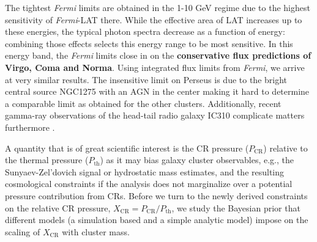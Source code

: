 \documentclass[10pt,aps,pra,reprint,amsmath,amsfonts,amssymb,showpacs,nofootinbib,floatfix]{revtex4-1}
\def\del#1{{}}
\def\C#1{{\bf #1}}
\newcommand{\Fermi}{{\em Fermi}\xspace}
\newcommand{\rmn}{\mathrm}
\newcommand{\CR}{\rmn{CR}}
\begin{document}
The tightest \Fermi limits are obtained in the 1-10 GeV
regime due to the highest sensitivity of \Fermi-LAT there. While the
effective area of LAT increases up to these energies, the typical
photon spectra decrease as a function of energy: combining those
effects selects this energy range to be most sensitive. In this
energy band, the \Fermi limits close in on the \C{conservative flux
  predictions of Virgo, Coma and Norma}. Using integrated flux limits
  from \Fermi, we arrive at very similar results. \del{We emphasize that
  by using our analytic modeling, the slight discrepancy of the
  scaling relation-based prediction with the \Fermi limit on Norma
  \cite{2010ApJ...717L..71A} is resolved: Norma simply seems to be
  less bright than an average cluster of the same mass as Norma.} The
  insensitive limit on Perseus is due to the bright central source
  NGC1275 with an AGN in the center \cite{2010ATel.2916....1M} making
  it hard to determine a comparable limit as obtained for the other
  clusters. Additionally, recent gamma-ray observations of
  the head-tail radio galaxy IC310 complicate matters furthermore
  \cite{2010ApJ...723L.207A,2010A&A...519L...6N}.

A quantity that is of great scientific interest is the CR pressure
($P_\CR$) relative to the thermal pressure ($P_\rmn{th}$) as it may
bias galaxy cluster observables, e.g., the Sunyaev-Zel’dovich signal
or hydrostatic mass estimates, and the resulting cosmological
constraints if the analysis does not marginalize over a potential
pressure contribution from CRs. Before we turn to the newly derived
constraints on the relative CR pressure, $X_\CR = P_\CR/P_\rmn{th}$,
we study the Bayesian prior that different models (a simulation based
and a simple analytic model) impose on the scaling of $X_\CR$ with
cluster mass.
\end{document}
